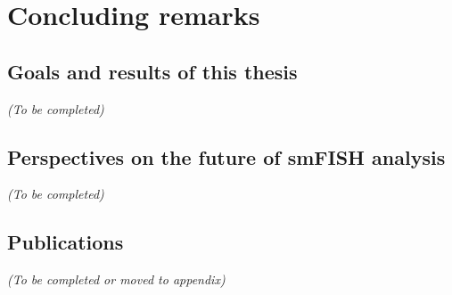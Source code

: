 
\chapter{Concluding remarks}
\label{ch:conclusion}

\minitoc
\newpage

\section{Goals and results of this thesis}
\label{sec:conclusion_thesis}

\begin{center}
	\textit{(To be completed)}
\end{center}


\section{Perspectives on the future of smFISH analysis}
\label{sec:conclusion_future}

\begin{center}
	\textit{(To be completed)}
\end{center}


\section{Publications}
\label{sec:conclusion_publications}

\begin{center}
	\textit{(To be completed or moved to appendix)}
\end{center}